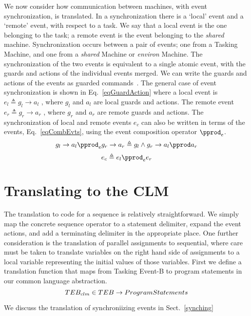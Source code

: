 We now consider how communication between machines, with event synchronization, is translated. In a synchronization there is a ‘local’ event and a ‘remote’ event, with respect to a task. We say that a local event is the one belonging to the task; a remote event is the event belonging to the \emph{shared} machine. Synchronization occurs between a pair of events; one from a Tasking Machine, and one from a \emph{shared} Machine or \emph{environ} Machine. The synchronization of the two events is equivalent to a single atomic event, with the guards and actions of the individual events merged. We can write the guards and actions of the events as guarded commands~\cite{Dijkstra75a}. The general case of event synchronization is shown in Eq.~\ref{eqGuardAction} where a local event is $e_l \triangleq g_l \rightarrow a_l$ , where $g_l$ and $a_l$ are local guards and actions. The remote event $e_r \triangleq g_r \rightarrow a_r$ , where $g_r$ and
$a_r$ are remote guards and actions. The synchronization of local and remote events $e_c$ can also be written in terms of the events, Eq.~\ref{eqCombEvts}, using the event composition operator $\pprod _e$.
%
\begin{equation}\label{eqGuardAction}
g_l \rightarrow a_l \pprod_e g_r \rightarrow a_r \triangleq g_l \land g_r \rightarrow a_l \pprod a_r
\end{equation}
%
\begin{equation}\label{eqCombEvts}
e_c \triangleq e_l \pprod _e e_r
\end{equation}

\section{Translating to the CLM}
The translation to code for a sequence is relatively straightforward. We simply map the concrete sequence operator to a statement delimiter, expand the event actions, and add a terminating delimiter in the appropriate place. One further consideration is the translation of parallel assignments to sequential, where care must be taken to translate variables on the right hand side of assignments to a local variable representing the initial values of those variables. First we define a translation function that maps from Tasking Event-B to program statements in our common language abstraction.   
\begin{equation}
TEB_{clm} \in  TEB \rightarrow ProgramStatements
\notag
\end{equation}

We discuss the translation of synchroniizing events in Sect.~\ref{synching}

